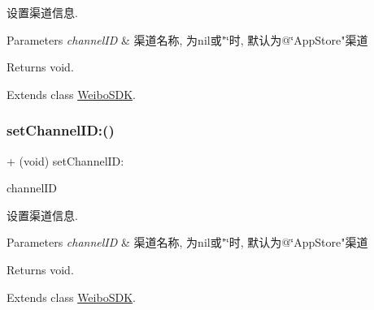 设置渠道信息. 
\begin{DoxyParams}{Parameters}
{\em channel\+ID} & 渠道名称, 为nil或"\char`\"{}时, 默认为@\char`\"{}App\+Store"渠道 \\
\hline
\end{DoxyParams}
\begin{DoxyReturn}{Returns}
void. 
\end{DoxyReturn}


Extends class \mbox{\hyperlink{interface_weibo_s_d_k_a8d9fad53942642ec304ecba4734e05c1}{Weibo\+S\+DK}}.

\mbox{\label{category_weibo_s_d_k_07_statistics_08_a8d9fad53942642ec304ecba4734e05c1}} 
\subsubsection{\texorpdfstring{set\+Channel\+I\+D\+:()}{setChannelID:()}\hspace{0.1cm}{\footnotesize\ttfamily [3/3]}}
{\footnotesize\ttfamily + (void) set\+Channel\+I\+D\+: \begin{DoxyParamCaption}\item[{(N\+S\+String $\ast$)}]{channel\+ID }\end{DoxyParamCaption}}

设置渠道信息. 
\begin{DoxyParams}{Parameters}
{\em channel\+ID} & 渠道名称, 为nil或"\char`\"{}时, 默认为@\char`\"{}App\+Store"渠道 \\
\hline
\end{DoxyParams}
\begin{DoxyReturn}{Returns}
void. 
\end{DoxyReturn}


Extends class \mbox{\hyperlink{interface_weibo_s_d_k_a8d9fad53942642ec304ecba4734e05c1}{Weibo\+S\+DK}}.

\mbox{\label{category_weibo_s_d_k_07_statistics_08_a0b32ee3e2b30059b93e7dea204b43818}} 
